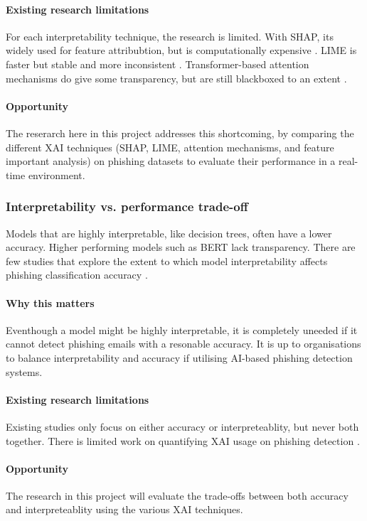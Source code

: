 \paragraph{Existing research limitations}
For each interpretability technique, the research is limited. With SHAP, its widely used for feature attribubtion, but is computationally expensive \citep{hadi2024adaptive}. LIME is faster but stable and more inconsistent \citep{ribeiro2016model}. Transformer-based attention mechanisms do give some transparency, but are still blackboxed to an extent \citep{bountakas2023helphed}.

\paragraph{Opportunity}
The reserarch here in this project addresses this shortcoming, by comparing the different XAI techniques (SHAP, LIME, attention mechanisms, and feature important analysis) on phishing datasets to evaluate their performance in a real-time environment.

\subsubsection*{Interpretability vs. performance trade-off}
Models that are highly interpretable, like decision trees, often have a lower accuracy. Higher performing models such as BERT lack transparency. There are few studies that explore the extent to which model interpretability affects phishing classification accuracy \citep{guidotti2018survey}.

\paragraph{Why this matters}
Eventhough a model might be highly interpretable, it is completely uneeded if it cannot detect phishing emails with a resonable accuracy. It is up to organisations to balance interpretability and accuracy if utilising AI-based phishing detection systems.

\paragraph{Existing research limitations}
Existing studies only focus on either accuracy or interpreteablity, but never both together. There is limited work on quantifying XAI usage on phishing detection \citep{patil2015survey}.

\paragraph{Opportunity}
The research in this project will evaluate the trade-offs between both accuracy and interpreteablity using the various XAI techniques.

